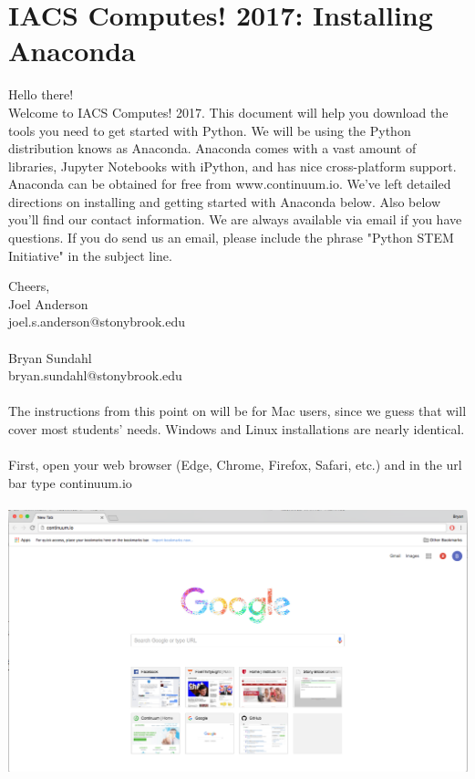 \documentclass[]{article}
\begin{document}
\section*{IACS Computes! 2017: Installing Anaconda}
Hello there! \\

Welcome to IACS Computes! 2017. This document will help you download the tools you need to get started with Python. We will be using the Python distribution knows as Anaconda. Anaconda comes with a vast amount of libraries, Jupyter Notebooks with iPython, and has nice cross-platform support. Anaconda can be obtained for free from www.continuum.io. We've left detailed directions on installing and getting started with Anaconda below. Also below you'll find our contact information. We are always available via email if you have questions. If you do send us an email, please include the phrase "Python STEM Initiative" in the subject line.

Cheers, \\

Joel Anderson \\
joel.s.anderson@stonybrook.edu\\ \\

Bryan Sundahl \\
bryan.sundahl@stonybrook.edu

\paragraph{}
The instructions from this point on will be for Mac users, since we guess that will cover most students' needs. Windows and Linux installations are nearly identical.
\paragraph{}
First, open your web browser (Edge, Chrome, Firefox, Safari, etc.) and in the url bar type continuum.io
\paragraph{}
\begin{centering}
    \centerline{\includegraphics[scale=0.35]{Screenshot_1.png}}
\end{centering}
\end{document}
